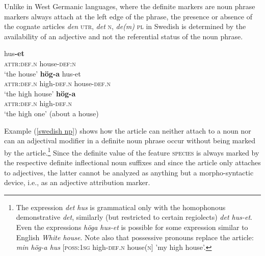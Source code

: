 Unlike in West Germanic languages, where the definite markers are noun phrase markers always attach at the left edge of the phrase, the presence or absence of the cognate articles \textit{den} \textsc{utr}, \textit{det} \textsc{n}, \textit{de(m)} \textsc{pl} in Swedish is determined by the availability of an adjective and not the referential status of the noun phrase. 
\begin{exe}
\label{swedish np}
\begin{xlist}
\ex
{} hus\textbf{-et}\\
	\textsc{attr:def.n} house-\textsc{def:n}\\
\glt	‘the house’
\ex	
{} \textbf{hög-a} hus-et\\
	\textsc{attr:def.n} high-\textsc{def.n} house-\textsc{def.n}\\
\glt	‘the high house’
\ex 
\label{art0}
 \textbf{hög-a}\\
	\textsc{attr:def.n} high-\textsc{def.n}\\
\glt	‘the high one’ (about a house)
\end{xlist}
\end{exe}
Example (\ref{swedish np}) shows how the article can neither attach to a noun nor can an adjectival modifier in a definite noun phrase occur without being marked by the article.\footnote{The expression \textit{det hus} is grammatical only with the homophonous demonstrative \textit{det}, similarly (but restricted to certain regiolects) \textit{det hus-et}. Even the expressions \textit{höga hus-et} is possible for some expression similar to English \textit{White house}. Note also that possessive pronouns replace the article: \textit{min hög-a hus} [\textsc{poss:1sg} high-\textsc{def.n} house(\textsc{n}] 'my high house’.} Since the definite value of the feature \textsc{species} is always marked by the respective definite inflectional noun suffixes %
 and since the article only attaches to adjectives, the latter cannot be analyzed as anything but a morpho-syntactic device, i.e., as an adjective attribution marker.

